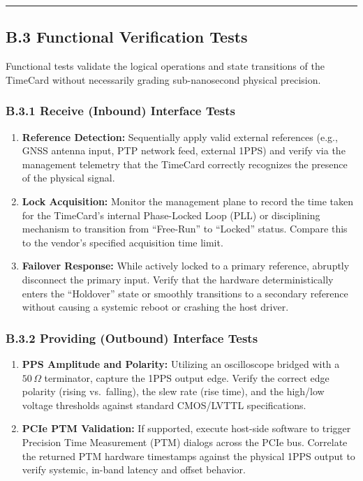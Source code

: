 \begin{center}\rule{0.5\linewidth}{0.5pt}\end{center}

\subsection{B.3 Functional Verification
Tests}\label{b.3-functional-verification-tests}

Functional tests validate the logical operations and state transitions
of the TimeCard without necessarily grading sub-nanosecond physical
precision.

\subsubsection{B.3.1 Receive (Inbound) Interface
Tests}\label{b.3.1-receive-inbound-interface-tests}

\begin{enumerate}
\def\labelenumi{\arabic{enumi}.}
\tightlist
\item
  \textbf{Reference Detection:} Sequentially apply valid external
  references (e.g., GNSS antenna input, PTP network feed, external 1PPS)
  and verify via the management telemetry that the TimeCard correctly
  recognizes the presence of the physical signal.
\item
  \textbf{Lock Acquisition:} Monitor the management plane to record the
  time taken for the TimeCard's internal Phase-Locked Loop (PLL) or
  disciplining mechanism to transition from ``Free-Run'' to ``Locked''
  status. Compare this to the vendor's specified acquisition time limit.
\item
  \textbf{Failover Response:} While actively locked to a primary
  reference, abruptly disconnect the primary input. Verify that the
  hardware deterministically enters the ``Holdover'' state or smoothly
  transitions to a secondary reference without causing a systemic reboot
  or crashing the host driver.
\end{enumerate}

\subsubsection{B.3.2 Providing (Outbound) Interface
Tests}\label{b.3.2-providing-outbound-interface-tests}

\begin{enumerate}
\def\labelenumi{\arabic{enumi}.}
\tightlist
\item
  \textbf{PPS Amplitude and Polarity:} Utilizing an oscilloscope bridged
  with a \(50\,\Omega\) terminator, capture the 1PPS output edge. Verify
  the correct edge polarity (rising vs.~falling), the slew rate (rise
  time), and the high/low voltage thresholds against standard CMOS/LVTTL
  specifications.
\item
  \textbf{PCIe PTM Validation:} If supported, execute host-side software
  to trigger Precision Time Measurement (PTM) dialogs across the PCIe
  bus. Correlate the returned PTM hardware timestamps against the
  physical 1PPS output to verify systemic, in-band latency and offset
  behavior.
\end{enumerate}

